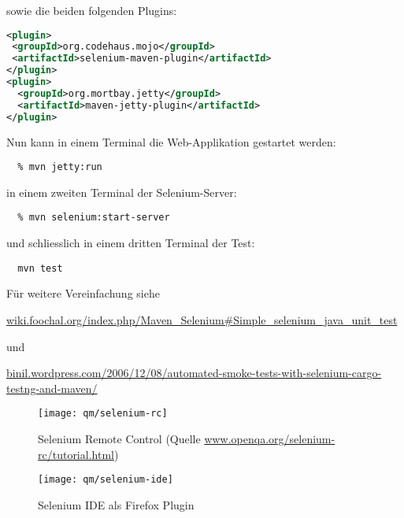\newslide
sowie die beiden folgenden Plugins:
\begin{lstlisting}[language=xml,
  morekeywords={plugin,groupId,artifactId}]
<plugin>
 <groupId>org.codehaus.mojo</groupId>
 <artifactId>selenium-maven-plugin</artifactId>
</plugin>
<plugin>
  <groupId>org.mortbay.jetty</groupId>
  <artifactId>maven-jetty-plugin</artifactId>
</plugin>
\end{lstlisting}
\newslide
Nun kann in einem Terminal die Web-Applikation gestartet werden:
\begin{lstlisting}
  % mvn jetty:run
\end{lstlisting}
in einem zweiten Terminal der Selenium-Server:
\begin{lstlisting}
  % mvn selenium:start-server
\end{lstlisting}
und schliesslich in einem dritten Terminal der Test:
\begin{lstlisting}
  mvn test
\end{lstlisting}
Für weitere Vereinfachung siehe

\href{http://wiki.foochal.org/index.php/Maven_Selenium#Simple_selenium_java_unit_test}
{wiki.foochal.org/index.php/Maven\_Selenium\#Simple\_selenium\_java\_unit\_test}

und

\href{http://binil.wordpress.com/2006/12/08/automated-smoke-tests-with-selenium-cargo-testng-and-maven/}
{binil.wordpress.com/2006/12/08/automated-smoke-tests-with-selenium-cargo-testng-and-maven/}
%
\begin{figure}[H]
\begin{center}
\texttt{[image: qm/selenium-rc]}
\end{center}
\caption{Selenium Remote Control
  (Quelle \href{http://www.openqa.org/selenium-rc/tutorial.html}
   {www.openqa.org/selenium-rc/tutorial.html})}
\end{figure}
\begin{figure}[H]
\begin{center}
\texttt{[image: qm/selenium-ide]}
\end{center}
\caption{Selenium IDE als Firefox Plugin}
\end{figure}
%
